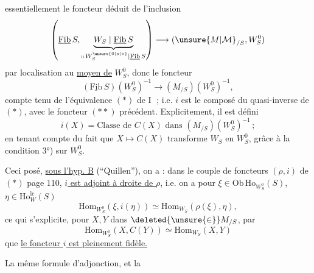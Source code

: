 essentiellement le foncteur déduit de l'inclusion
\[
\left(\underline{\mathrm{Fib}}\,S,\underbrace{W_S\mid\underline{\mathrm{Fib}}\,S}_{\shortparallel\,W_S^{\unsure{0|o|\circ}}\mid\underline{\mathrm{Fib}}\,S}\right)\longrightarrow(\unsure{M|\mathcal M}_{/S},W_S^0)
\]
par localisation au \uline{moyen de} $W_S^0$, donc le  foncteur
\[
(\underline{\mathrm{Fib}}\,S)(W_S^0)^{-1}\longrightarrow(M_{/S})(W_S^0)^{-1},\tag*{$(**)$}
\]
compte tenu de l'équivalence $(*)$ de \textcircled{I} ; i.e. $i$ est le composé du quasi-inverse de $(*)$, avec le foncteur $(**)$ précédent. Explicitement, il est défini 
\[
i(X)=\text{Classe de }C(X)\text{ dans }(M_{/S})(W_S^0)^{-1}\,;
\]
en tenant compte du fait que $X\longmapsto C(X)$ transforme $W_S$ en $W_S^0$, grâce à la condition 3°) sur $W_S^0$.

Ceci posé, \uline{sous l'hyp. B} (``Quillen''), on a : dans le couple de foncteurs $(\rho,i)$ de $(*)$ page 110, \uline{$i$ est adjoint à droite de $\rho$}, i.e. on a pour $\xi\in\mathrm{Ob}\,\mathrm{Ho}_{W_S^0}(S)$, $\eta\in\mathrm{Ho}^{\mathrm{lc}}_W(S)$
\[
\mathrm{Hom}_{W_S^0}(\xi,i(\eta))\simeq\mathrm{Hom}_{W_S}(\rho(\xi),\eta),
\]
ce qui s'explicite, pour $X,Y$ dans $\deleted{\unsure{\in}}M_{/S}$, par
\[
\boxed{\mathrm{Hom}_{W_S^0}(X,C(Y))\simeq\mathrm{Hom}_{W_S}(X,Y)}
\]
 que \uline{le foncteur $i$ est pleinement fidèle.}

La même formule d'adjonction, et la
